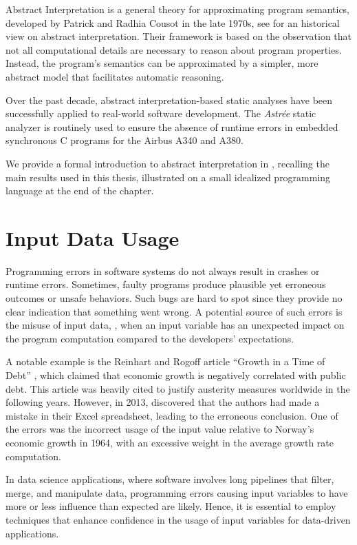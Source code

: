 Abstract Interpretation  is a general theory for approximating program semantics, developed by Patrick and Radhia Cousot in the late 1970s, see  for an historical view on abstract interpretation.
Their framework is based on the observation that not all computational details are necessary to reason about program properties.
Instead, the program's semantics can be approximated by a simpler, more abstract model that facilitates automatic reasoning.

Over the past decade, abstract interpretation-based static analyses have been successfully applied to real-world software development.
The \emph{Astrée} static analyzer  is routinely used to ensure the absence of runtime errors in embedded synchronous C programs for the Airbus A340 and A380.

We provide a formal introduction to abstract interpretation in , recalling the main results used in this thesis, illustrated on a small idealized programming language at the end of the chapter.

\section{Input Data Usage}

Programming errors in software systems do not always result in crashes or runtime errors.
Sometimes, faulty programs produce plausible yet erroneous outcomes or unsafe behaviors.
Such bugs are hard to spot since they provide no clear indication that something went wrong.
A potential source of such errors is the misuse of input data, \ie, when an input variable has an unexpected impact on the program computation compared to the developers' expectations.

A notable example is the Reinhart and Rogoff article “Growth in a Time of Debt” , which claimed that economic growth is negatively correlated with public debt.
This article was heavily cited to justify austerity measures worldwide in the following years.
However, in 2013,  discovered that the authors had made a mistake in their Excel spreadsheet, leading to the erroneous conclusion.
One of the errors was the incorrect usage of the input value relative to Norway's economic growth in 1964, with an excessive weight in the average growth rate computation.

In data science applications, where software involves long pipelines that filter, merge, and manipulate data, programming errors causing input variables to have more or less influence than expected are likely.
Hence, it is essential to employ techniques that enhance confidence in the usage of input variables for data-driven applications.

